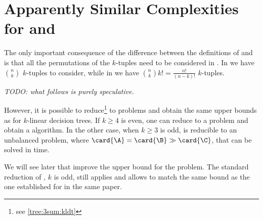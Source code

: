 \section{Apparently Similar Complexities for \kSUM and \kLDT}

The only important consequence of the difference between the definitions of
\kSUM and \kLDT is that all the permutations of the $k$-tuples need to be
considered in \kLDT. In \kSUM we have $\binom{n}{k}$ $k$-tuples to consider,
while in \kLDT we have $\binom{n}{k} k! = \frac{n!}{(n-k)!}$ $k$-tuples.

\emph{TODO: what follows is purely speculative.}

However, it is possible to reduce\footnote{see \ref{tree:3sum:kldt}} \kLDT to
\kSUM problems and obtain the same upper bounds as \kSUM for $k$-linear
decision trees. If $k \ge 4$ is even, one can reduce \kLDT to a \twoSUM problem
and obtain a  algorithm. In the other case, when
$k \ge 3$ is odd, \kLDT is reducible to an unbalanced \threeSUM problem, where
$\card{\A} = \card{\B} \gg \card{\C}$, that can be solved in
 time.

We will see later that \citet*{gronlund:2014} improve the upper bound for the
\threeSUM problem. The standard reduction of \kLDT, $k$ is odd, still applies
and allows to match the same 
bound as the one established for \threeSUM in the same paper.


